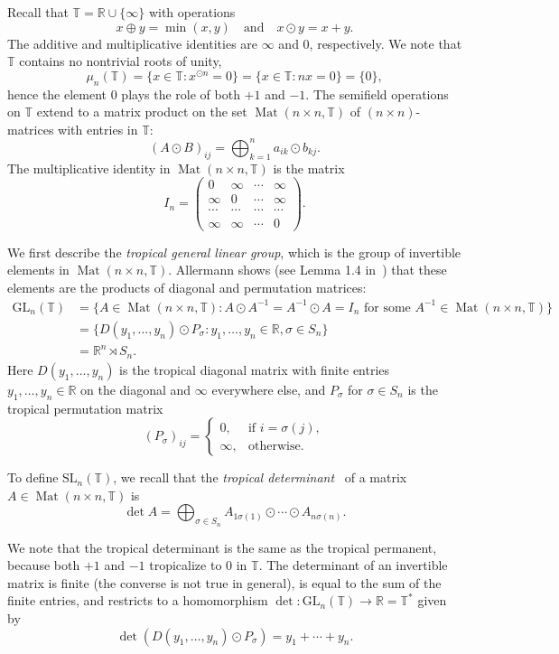 \documentclass[10pt, a4paper]{amsart}
\theoremstyle{definition}
\theoremstyle{myitemstyle}
\newcommand{\RR}{\mathbb{R}}
\newcommand{\TT}{\mathbb{T}}
\newcommand{\SL}{{\mathrm{SL}}}
\newcommand{\GL}{{\mathrm{GL}}}
\DeclareMathOperator{\Mat}{Mat}
\begin{document}
Recall that $\TT=\RR\cup \{\infty\}$ with operations
\[
x\oplus y=\min(x,y)\quad \text{and}\quad x\odot y=x+y.
\]
The additive and multiplicative identities are $\infty$ and $0$, respectively. We note that $\TT$ contains no nontrivial roots of unity,
\[
\mu_n(\TT)=\{x\in \TT: x^{\odot n}=0\}=\{x\in \TT: nx=0\}=\{0\},
\]
hence the element $0$ plays the role of both $+1$ and $-1$. The semifield operations on $\TT$ extend to a matrix product on the set $\Mat(n\times n,\TT)$ of $(n\times n)$-matrices with entries in $\TT$: 
\[
(A\odot B)_{ij}=\bigoplus_{k=1}^n a_{ik}\odot b_{kj}.
\]
The multiplicative identity in $\Mat(n\times n,\TT)$ is the matrix
\[
I_n=\left(\begin{array}{cccc}
    0 & \infty & \cdots & \infty  \\
    \infty & 0 & \cdots & \infty  \\
    \cdots & \cdots & \cdots & \cdots  \\
    \infty & \infty & \cdots & 0  
\end{array}
\right).
\]

We first describe the \emph{tropical general linear group}, which is the group of invertible elements in $\Mat(n\times n,\TT)$. Allermann shows (see Lemma 1.4 in~\cite{TropChern}) that these elements are the products of diagonal and permutation matrices:
\[
\begin{split}
\GL_n(\TT)&=\{A\in \Mat(n\times n,\TT): A\odot A^{-1}=A^{-1}\odot A=I_n\mbox{ for some }A^{-1}\in \Mat(n\times n,\TT)\}\\
&=\{ D(y_1,\ldots,y_n)\odot P_{\sigma}:y_1,\ldots,y_n\in \RR,\sigma\in S_n\}\\
&=\RR^n\rtimes S_n.
\end{split}
\]
Here $D(y_1,\ldots,y_n)$ is the tropical diagonal matrix with finite entries $y_1,\ldots,y_n\in \RR$ on the diagonal and $\infty$ everywhere else, and $P_{\sigma}$ for $\sigma\in S_n$ is the tropical permutation matrix 
\[
(P_{\sigma})_{ij}=\begin{cases}
    0, & \mbox{if }i=\sigma(j),\\
    \infty, & \mbox{otherwise.}
\end{cases}
\]

To define $\SL_n(\TT)$, we recall that the \emph{tropical determinant}~\cite{maclagan2015introduction} of a matrix $A\in \Mat(n\times n,\TT)$ is 
\[
\det A=\bigoplus_{\sigma\in S_n} A_{1\sigma(1)}\odot\cdots\odot A_{n\sigma(n)}.
\]

We note that the tropical determinant is the same as the tropical permanent, because both $+1$ and $-1$ tropicalize to $0$ in $\TT$. The determinant of an invertible matrix is finite (the converse is not true in general), is equal to the sum of the finite entries, and restricts to a homomorphism $\det:\GL_n(\TT)\to \RR=\TT^\ast$ given by
\[
\det (D(y_1,\ldots,y_n)\odot P_{\sigma})=y_1+\cdots+y_n.
\]
\end{document}
